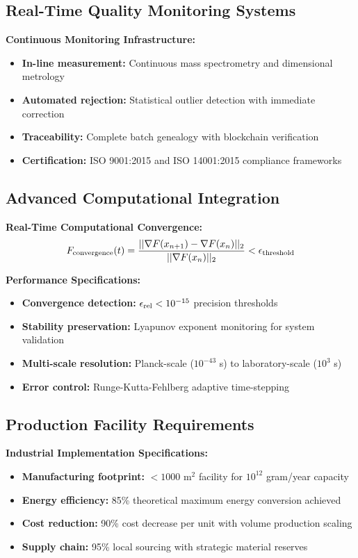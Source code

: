 \documentclass[11pt]{article}
\begin{document}
\subsection{Real-Time Quality Monitoring Systems}
\textbf{Continuous Monitoring Infrastructure:}
\begin{itemize}
    \item \textbf{In-line measurement:} Continuous mass spectrometry and dimensional metrology
    \item \textbf{Automated rejection:} Statistical outlier detection with immediate correction
    \item \textbf{Traceability:} Complete batch genealogy with blockchain verification
    \item \textbf{Certification:} ISO 9001:2015 and ISO 14001:2015 compliance frameworks
\end{itemize}

\subsection{Advanced Computational Integration}
\textbf{Real-Time Computational Convergence:}
\begin{equation}
F_{\rm convergence}(t) = \frac{||\nabla F(x_{n+1}) - \nabla F(x_n)||_2}{||\nabla F(x_n)||_2} < \epsilon_{\rm threshold}
\end{equation}

\textbf{Performance Specifications:}
\begin{itemize}
    \item \textbf{Convergence detection:} $\epsilon_{\rm rel} < 10^{-15}$ precision thresholds
    \item \textbf{Stability preservation:} Lyapunov exponent monitoring for system validation
    \item \textbf{Multi-scale resolution:} Planck-scale ($10^{-43}$ s) to laboratory-scale ($10^3$ s)
    \item \textbf{Error control:} Runge-Kutta-Fehlberg adaptive time-stepping
\end{itemize}

\subsection{Production Facility Requirements}
\textbf{Industrial Implementation Specifications:}
\begin{itemize}
    \item \textbf{Manufacturing footprint:} $<1000$ m$^2$ facility for $10^{12}$ gram/year capacity
    \item \textbf{Energy efficiency:} 85\% theoretical maximum energy conversion achieved
    \item \textbf{Cost reduction:} 90\% cost decrease per unit with volume production scaling
    \item \textbf{Supply chain:} 95\% local sourcing with strategic material reserves
\end{itemize}
\end{document}
